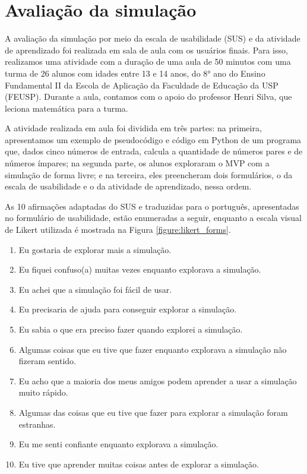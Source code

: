 

\chapter{Avaliação da simulação} \label{evaluation}

A avaliação da simulação por meio da escala de usabilidade (SUS) e da atividade de aprendizado foi realizada em sala de aula com os usuários finais. Para isso, realizamos uma atividade com a duração de uma aula de 50 minutos com uma turma de 26 alunos com idades entre 13 e 14 anos, do 8° ano do Ensino Fundamental II da Escola de Aplicação da Faculdade de Educação da USP (FEUSP). Durante a aula, contamos com o apoio do professor Henri Silva, que leciona matemática para a turma. 

A atividade realizada em aula foi dividida em três partes: na primeira, apresentamos um exemplo de pseudocódigo e código em Python de um programa que, dados cinco números de entrada, calcula a quantidade de números pares e de números ímpares; na segunda parte, os alunos exploraram o MVP com a simulação de forma livre; e na terceira, eles preencheram dois formulários, o da escala de usabilidade e o da atividade de aprendizado, nessa ordem.

As 10 afirmações adaptadas do SUS e traduzidas para o português, apresentadas no formulário de usabilidade, estão enumeradas a seguir, enquanto a escala visual de Likert utilizada é mostrada na Figura \ref{figure:likert_forms}.

\begin{enumerate}
    \item Eu gostaria de explorar mais a simulação.
    \item Eu fiquei confuso(a) muitas vezes enquanto explorava a simulação.
    \item Eu achei que a simulação foi fácil de usar.
    \item Eu precisaria de ajuda para conseguir explorar a simulação.
    \item Eu sabia o que era preciso fazer quando explorei a simulação.
    \item Algumas coisas que eu tive que fazer enquanto explorava a simulação não fizeram sentido.
    \item Eu acho que a maioria dos meus amigos podem aprender a usar a simulação muito rápido.
    \item Algumas das coisas que eu tive que fazer para explorar a simulação foram estranhas.
    \item Eu me senti confiante enquanto explorava a simulação.
    \item Eu tive que aprender muitas coisas antes de explorar a simulação.
\end{enumerate}

